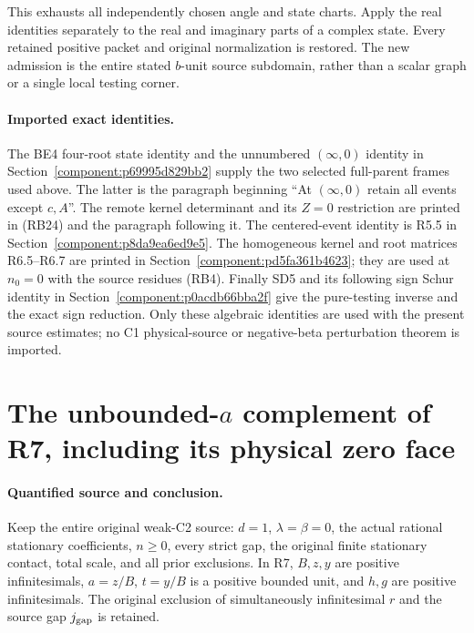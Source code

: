 This exhausts all independently chosen angle and state charts.
Apply the real identities separately to the real and imaginary parts
of a complex state. Every retained positive packet and original
normalization is restored. The new admission is the entire stated
$b$-unit source subdomain, rather than a scalar graph or a single
local testing corner.


\paragraph{Imported exact identities.}
The BE4 four-root state identity and the unnumbered $(\infty,0)$
identity in Section~\ref{component:p69995d829bb2} supply the two
selected full-parent frames used above. The latter is the paragraph
beginning ``At $(\infty,0)$ retain all events except $c,A$''.
The remote kernel determinant and its $Z=0$ restriction are printed
in (RB24) and the paragraph following it. The centered-event identity
is R5.5 in Section~\ref{component:p8da9ea6ed9e5}. The homogeneous
kernel and root matrices R6.5--R6.7 are printed in
Section~\ref{component:pd5fa361b4623}; they are used at $n_0=0$
with the source residues (RB4). Finally SD5 and its following sign
Schur identity in Section~\ref{component:p0acdb66bba2f} give the
pure-testing inverse and the exact sign reduction. Only these
algebraic identities are used with the present source estimates;
no C1 physical-source or negative-beta perturbation theorem is imported.


\section{\texorpdfstring{The unbounded-$a$ complement of R7, including its physical zero face}{The unbounded-a complement of R7, including its physical zero face}}
\label{component:p405d96527133}

\label{p405d96527133:sec:r7-unbounded-a}

\paragraph{Quantified source and conclusion.}
Keep the entire original weak-C2 source: $d=1$, $\lambda=\beta=0$,
the actual rational stationary coefficients, $n\ge0$, every strict gap,
the original finite stationary contact, total scale, and all prior
exclusions. In R7, $B,z,y$ are positive infinitesimals,
$a=z/B$, $t=y/B$ is a positive bounded unit, and $h,g$ are positive
infinitesimals. The original exclusion of simultaneously infinitesimal
$r$ and the source gap $j_{\rm gap}$ is retained.

